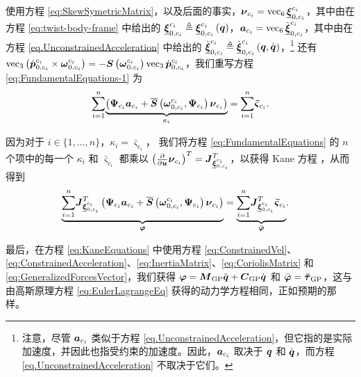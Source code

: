 使用方程 \eqref{eq:SkewSymetricMatrix}，以及后面的事实，$\boldsymbol{\nu}_{c_{i}}=\operatorname{vec}_{6}\underline{\boldsymbol{\xi}}_{0,c_{i}}^{c_{i}}$，其中由在方程 \eqref{eq:twist-body-frame} 中给出的 $\underline{\boldsymbol{\xi}}_{0,c_{i}}^{c_{i}}\triangleq\underline{\boldsymbol{\xi}}_{0,c_{i}}^{c_{i}}\left(\boldsymbol{q}\right)$，$\boldsymbol{a}_{c_{i}}=\operatorname{vec}_{6}\dot{\underline{\boldsymbol{\xi}}}_{0,c_{i}}^{c_{i}}$，其中由在方程 \eqref{eq.UnconstrainedAcceleration} 中给出的 $\dot{\underline{\boldsymbol{\xi}}}_{0,c_{i}}^{c_{i}}\triangleq\dot{\underline{\boldsymbol{\xi}}}_{0,c_{i}}^{c_{i}}\left(\boldsymbol{q},\dot{\boldsymbol{q}}\right)$，\footnote{注意，尽管 $\boldsymbol{a}_{c_{i}}$ 类似于方程 \eqref{eq.UnconstrainedAcceleration}，但它指的是实际加速度，并因此也指受约束的加速度。因此，$\boldsymbol{a}_{c_{i}}$ 取决于 $\boldsymbol{q}$ 和 $\dot{\boldsymbol{q}}$，而方程 \eqref{eq.UnconstrainedAcceleration} 不取决于它们。} 还有 $\operatorname{vec}_{3}\left(\dot{\boldsymbol{p}}_{0,c_{i}}^{c_{i}}\times\boldsymbol{\omega}_{0,c_{i}}^{c_{i}}\right)=-\boldsymbol{S}\left(\boldsymbol{\omega}_{0,c_{i}}^{c_{i}}\right)\operatorname{vec}_{3}\dot{\boldsymbol{p}}_{0,c_{i}}^{c_{i}}$，我们重写方程 \eqref{eq:FundamentalEquations-1} 为
\begin{equation}
\underset{i=1}{\sum^{n}}\underset{\kappa_{i}}{\underbrace{\left(\boldsymbol{\Psi}_{c_{i}}\boldsymbol{a}_{c_{i}}+\overline{\boldsymbol{S}}\left(\boldsymbol{\omega}_{0,c_{i}}^{c_{i}},\boldsymbol{\Psi}_{c_{i}}\right)\boldsymbol{\nu}_{c_{i}}\right)}}=\underset{i=1}{\sum^{n}}\boldsymbol{\bar{\varsigma}}_{c_{i}}.\label{eq:FundamentalEquations}
\end{equation}

因为对于 $i\in\{1,\ldots,n\}$，$\kappa_{i}=\bar{\varsigma}_{c_{i}}$，
我们将方程 \eqref{eq:FundamentalEquations} 的 $n$ 个项中的每一个 $\kappa_{i}$ 和 $\bar{\varsigma}_{c_{i}}$ 都乘以 $\left(\frac{\partial}{\partial\boldsymbol{u}}\boldsymbol{\nu}_{c_{i}}\right)^{T}=\boldsymbol{J}_{\underline{\boldsymbol{\xi}}_{0,c_{i}}^{c_{i}}}^{T}$，以获得 Kane 方程 \cite{Kane1983Dynamics}，从而得到
\begin{align}
\underset{\boldsymbol{\varphi}}{\underbrace{\underset{i=1}{\sum^{n}}\boldsymbol{J}_{\underline{\boldsymbol{\xi}}_{0,c_{i}}^{c_{i}}}^{T}\left(\boldsymbol{\Psi}_{c_{i}}\boldsymbol{a}_{c_{i}}+\overline{\boldsymbol{S}}\left(\boldsymbol{\omega}_{0,c_{i}}^{c_{i}},\boldsymbol{\Psi}_{c_{i}}\right)\boldsymbol{\nu}_{c_{i}}\right)}} & =\underset{\bar{\boldsymbol{\varphi}}}{\underbrace{\underset{i=1}{\sum^{n}}\boldsymbol{J}_{\underline{\boldsymbol{\xi}}_{0,c_{i}}^{c_{i}}}^{T}\boldsymbol{\bar{\varsigma}}_{c_{i}}}}.\label{eq:KaneEquations}
\end{align}

最后，在方程 \eqref{eq:KaneEquations} 中使用方程 \eqref{eq:ConstrainedVel}、\eqref{eq:ConstrainedAcceleration}、\eqref{eq:InertiaMatrix}、\eqref{eq:CoriolisMatrix} 和 \eqref{eq:GeneralizedForcesVector}，我们获得 $\boldsymbol{\varphi}=\boldsymbol{M}_{\text{GP}}\ddot{\boldsymbol{q}}+\boldsymbol{C}_{\text{GP}}\dot{\boldsymbol{q}}$ 和 $\bar{\boldsymbol{\varphi}}=\boldsymbol{\bar{\tau}}_{\mathrm{GP}}$，这与由高斯原理方程 \eqref{eq:EulerLagrangeEq} 获得的动力学方程相同，正如预期的那样。



